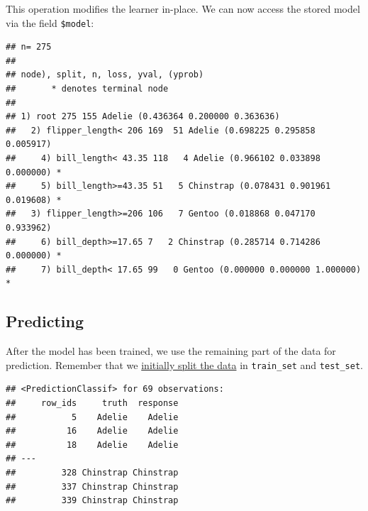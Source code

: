 \documentclass[
]{scrbook}
\newenvironment{Shaded}{\begin{snugshade}}{\end{snugshade}}
\newcommand{\AttributeTok}[1]{\textcolor[rgb]{0.77,0.63,0.00}{#1}}
\newcommand{\FunctionTok}[1]{\textcolor[rgb]{0.00,0.00,0.00}{#1}}
\newcommand{\NormalTok}[1]{#1}
\newcommand{\OtherTok}[1]{\textcolor[rgb]{0.56,0.35,0.01}{#1}}
\newcommand{\SpecialCharTok}[1]{\textcolor[rgb]{0.00,0.00,0.00}{#1}}
\renewenvironment{Shaded} {\begin{snugshade}\small} {\end{snugshade}}
\begin{document}
This operation modifies the learner in-place.
We can now access the stored model via the field \texttt{\$model}:

\begin{Shaded}
\end{Shaded}

\begin{verbatim}
## n= 275 
## 
## node), split, n, loss, yval, (yprob)
##       * denotes terminal node
## 
## 1) root 275 155 Adelie (0.436364 0.200000 0.363636)  
##   2) flipper_length< 206 169  51 Adelie (0.698225 0.295858 0.005917)  
##     4) bill_length< 43.35 118   4 Adelie (0.966102 0.033898 0.000000) *
##     5) bill_length>=43.35 51   5 Chinstrap (0.078431 0.901961 0.019608) *
##   3) flipper_length>=206 106   7 Gentoo (0.018868 0.047170 0.933962)  
##     6) bill_depth>=17.65 7   2 Chinstrap (0.285714 0.714286 0.000000) *
##     7) bill_depth< 17.65 99   0 Gentoo (0.000000 0.000000 1.000000) *
\end{verbatim}

\hypertarget{predicting}{%
\subsection{Predicting}\label{predicting}}

After the model has been trained, we use the remaining part of the data for prediction.
Remember that we \protect\hyperlink{split-data}{initially split the data} in \texttt{train\_set} and \texttt{test\_set}.

\begin{Shaded}
\end{Shaded}

\begin{verbatim}
## <PredictionClassif> for 69 observations:
##     row_ids     truth  response
##           5    Adelie    Adelie
##          16    Adelie    Adelie
##          18    Adelie    Adelie
## ---                            
##         328 Chinstrap Chinstrap
##         337 Chinstrap Chinstrap
##         339 Chinstrap Chinstrap
\end{verbatim}
\end{document}

